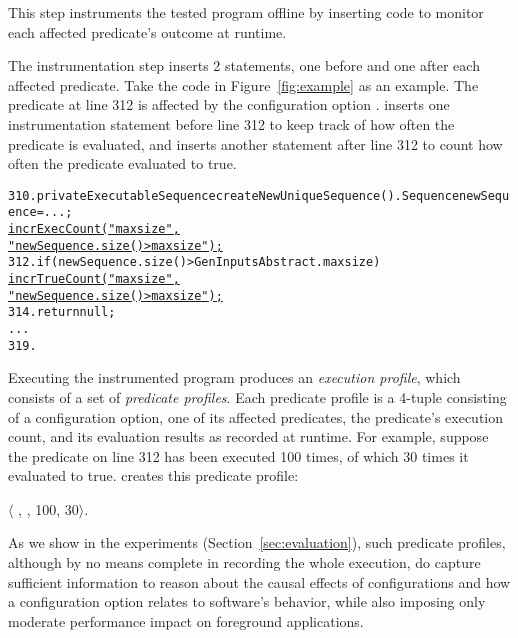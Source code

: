 This step instruments the tested program offline
by inserting code to monitor each affected predicate's outcome
at runtime.

The instrumentation step inserts 2 statements, one
before and one after each affected predicate. Take
the code in Figure~\ref{fig:example} as an example.
The predicate at line 312 is affected by
the configuration option . \ourtool inserts
one instrumentation statement before line 312 to
keep track of how often the predicate is evaluated, and
inserts another statement after line 312 to count how often
the predicate evaluated to true.


\begin{CodeOut}
\begin{alltt}
310. private ExecutableSequence createNewUniqueSequence() .   Sequence newSequence = ...; 
       \underline{incrExecCount("maxsize",}
                     \underline{"newSequence.size() > maxsize");}
312.   if (newSequence.size() > GenInputsAbstract.maxsize) \ttlcb
         \underline{incrTrueCount("maxsize",}
                       \underline{"newSequence.size() > maxsize");}
314.     return null;
      ...
319. \ttrcb
\end{alltt}
\end{CodeOut}


Executing the instrumented program produces an \textit{execution profile}, which
consists of a set of \textit{predicate profiles}.
Each predicate profile is a 4-tuple consisting of a configuration option,
one of its affected predicates, the predicate's execution count, and its evaluation results as recorded at runtime. For example,
suppose the predicate on line 312 has been executed 100 times, of which
30 times it evaluated to true. \ourtool creates this predicate
profile:

\noindent $\langle$ , , 100, 30$\rangle$.

\vspace{1mm}


As we show in the experiments (Section~\ref{sec:evaluation}),
such predicate profiles, although by no means complete in
recording the whole execution, do capture
sufficient information to reason about the causal effects of configurations
and how a configuration option relates to software's behavior, while
also imposing only moderate performance impact
on foreground applications.





